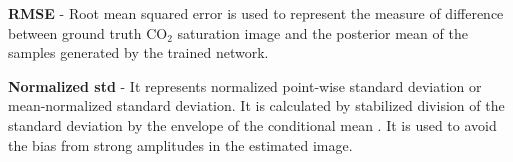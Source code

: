 \documentclass{article}
\begin{document}
\begin{appendices}
\textbf{RMSE} - Root mean squared error is used to represent the measure of difference between ground truth CO$_2$ saturation image and the posterior mean of the samples generated by the trained network.

\textbf{Normalized std} - It represents normalized point-wise standard deviation or mean-normalized standard deviation. It is calculated by stabilized division of the standard deviation by the envelope of the conditional mean \cite{siahkoohi2023reliable}. It is used to avoid the bias from strong amplitudes in the estimated image.

\end{appendices}
\end{document}
